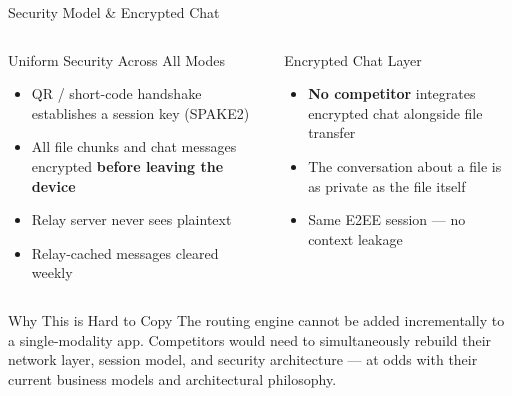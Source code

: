 \documentclass[xcolor=table,dvipsnames,svgnames,aspectratio=169]{beamer}
\begin{document}
\begin{frame}[shrink=33]{Security Model \& Encrypted Chat}
  \begin{columns}[t]
    \begin{block}{Uniform Security Across All Modes}
      \begin{itemize}
        \item QR / short-code handshake establishes a session key (SPAKE2)
        \item All file chunks and chat messages encrypted \textbf{before leaving the device}
        \item Relay server never sees plaintext
        \item Relay-cached messages cleared weekly
      \end{itemize}
    \end{block}
    \begin{block}{Encrypted Chat Layer}
      \begin{itemize}
        \item \textbf{No competitor} integrates encrypted chat alongside file transfer
        \item The conversation about a file is as private as the file itself
        \item Same E2EE session --- no context leakage
      \end{itemize}
    \end{block}
  \end{columns}

  \vspace{1em}

  \begin{alertblock}{Why This is Hard to Copy}
    The routing engine cannot be added incrementally to a single-modality app. Competitors would need to simultaneously rebuild their network layer, session model, and security architecture --- at odds with their current business models and architectural philosophy.
  \end{alertblock}
\end{frame}
\end{document}

